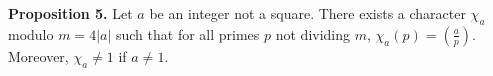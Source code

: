 \textbf{Proposition 5.} Let $a$ be an integer not a square. There exists a character $\chi_a$ modulo $m = 4|a|$ such that for all primes $p$ not dividing $m$, $\chi_a(p) = \left(\frac{a}{p}\right)$. Moreover, $\chi_a \neq 1$ if $a \neq 1$.
